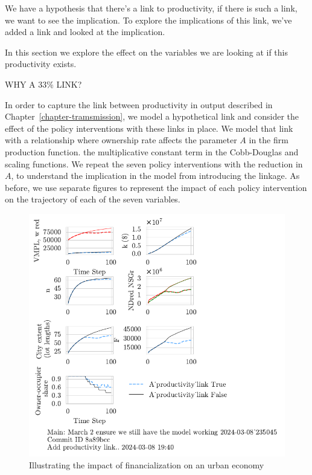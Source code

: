 We have a hypothesis that there's a link to productivity, if there is such a link, we want to see the implication.
To explore the implications of this link, we've added a link and looked at the implication. 


In this section we explore the effect on the variables we are looking at if this productivity exists. 

{\color{red} WHY A 33\% LINK?}

In order to capture the link between productivity in output described in Chapter~\ref{chapter-tramsmission}, we model a hypothetical link and consider the effect of the policy interventions with these links in place. We model that link with a relationship where ownership rate affects the parameter $A$ in the firm production function. the 
multiplicative constant term in the Cobb-Douglas and scaling functions. 
We repeat the seven policy interventions with the %
reduction in $A$, to understand the implication in the model from introducing the linkage. 
As before, we use separate figures to represent the impact of each policy intervention on the trajectory of each of the seven variables. 

\begin{figure}[h!tb]\label{fig-impact-channel-example}
    \centering
    \includegraphics[scale=1, trim=.25cm 2cm .25cm .25cm, clip]{fig/productivity_link.pdf}
    \caption{Illustrating the impact of financialization on an urban economy}
\end{figure}

